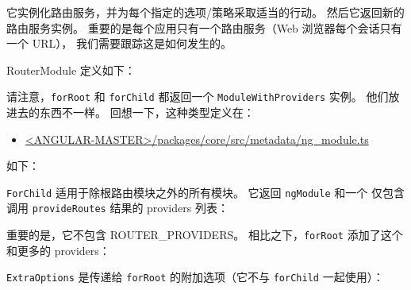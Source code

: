 它实例化路由服务，并为每个指定的选项/策略采取适当的行动。
然后它返回新的路由服务实例。
重要的是每个应用只有一个路由服务（Web 浏览器每个会话只有一个 URL），
我们需要跟踪这是如何发生的。


RouterModule 定义如下：




请注意，\texttt{forRoot} 和 \texttt{forChild} 都返回一个 \texttt{ModuleWithProviders} 实例。
他们放进去的东西不一样。
回想一下，这种类型定义在：

\begin{itemize}
  \item \href{https://github.com/angular/angular/blob/master/packages/core/src/metadata/ng_module.ts}
        {<ANGULAR-MASTER>/packages/core/src/metadata/ng\_module.ts}
\end{itemize}


如下：




\texttt{ForChild} 适用于除根路由模块之外的所有模块。
它返回 \texttt{ngModule} 和一个
仅包含调用 \texttt{provideRoutes} 结果的 providers 列表：




重要的是，它不包含 ROUTER\_PROVIDERS。
相比之下，\texttt{forRoot} 添加了这个和更多的 providers：




\texttt{ExtraOptions} 是传递给 \texttt{forRoot} 的附加选项（它不与 \texttt{forChild} 一起使用）：

